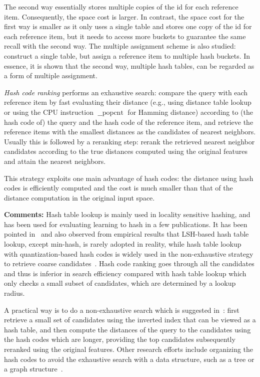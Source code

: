 \documentclass[10pt,journal,compsoc]{IEEEtran}
\begin{document}
The second way essentially stores multiple copies
of the id for each reference item.
Consequently, the space cost is larger.
In contrast,
the space cost for the first way
is smaller
as it only uses a single table
and stores one copy of the id for each reference item,
but it needs to access more buckets to guarantee
the same recall
with the second way.
The multiple assignment scheme is also studied:
construct a single table,
but assign a reference item to multiple hash buckets.
In essence,
it is shown that
the second way, multiple hash tables,
can be regarded as
a form of multiple assignment.



\emph{Hash code ranking}
performs an exhaustive search:
compare the query with each reference item
by fast evaluating their distance
(e.g., using distance table lookup or using the CPU instruction $\operatorname{\_\_popcnt}$ for Hamming distance)
according to (the hash code of) the query and the hash code of the reference item,
and retrieve the reference items with the smallest distances
as the candidates of nearest neighbors.
Usually this is followed by
a reranking step:
rerank the retrieved nearest neighbor candidates
according to the true distances
computed using the original features
and attain the nearest neighbors.

This strategy exploits one main advantage
of hash codes: the distance using hash codes
is efficiently computed
and the cost is much smaller
than that of the distance computation
in the original input space.


\textbf{Comments:}
Hash table lookup is mainly used in locality sensitive hashing,
and has been used for evaluating learning to hash in a few publications.
It has been pointed in~\cite{WeissTF08}
and also observed from empirical results
that LSH-based hash table lookup,
except min-hash,
is rarely adopted in reality,
while hash table lookup with quantization-based hash codes
is widely used in the non-exhaustive strategy
to retrieve coarse candidates~\cite{JegouDS11}.
Hash code ranking goes through all the candidates
and thus is inferior in search efficiency
compared with hash table lookup
which only checks a small subset of candidates,
which are determined by a lookup radius.


A practical way
is to do a non-exhaustive search
which is suggested in~\cite{JegouDS11, BabenkoL12}:
first retrieve a small set of candidates
using the inverted index that can be viewed as a hash table,
and then compute the distances of the query
to the candidates using the hash codes which are longer,
providing the top candidates subsequently reranked using the original features.
Other research efforts include organizing the hash codes to avoid the exhaustive search
with a data structure,
such as a tree or a graph structure~\cite{MujaL12}.
\end{document}
